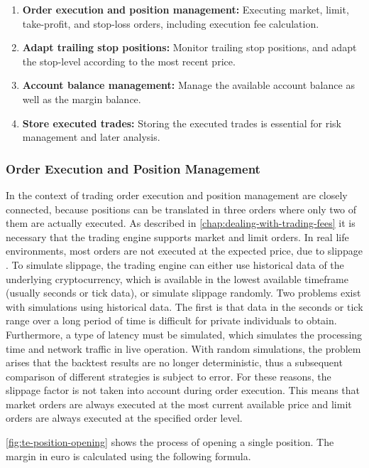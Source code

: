 \begin{enumerate}
    \item \textbf{Order execution and position management:} Executing market, limit, take-profit, and stop-loss orders, including execution fee calculation.
    \item \textbf{Adapt trailing stop positions:} Monitor trailing stop positions, and adapt the stop-level according to the most recent price.
    \item \textbf{Account balance management:} Manage the available account balance as well as the margin balance.
    \item \textbf{Store executed trades:} Storing the executed trades is essential for risk management and later analysis.
\end{enumerate}

\subsubsection{Order Execution and Position Management}

In the context of trading order execution and position management are closely connected, because positions can be translated in three orders where only two of them are actually executed.
As described in \autoref{chap:dealing-with-trading-fees} it is necessary that the trading engine supports market and limit orders.
In real life environments, most orders are not executed at the expected price, due to slippage \cite{ig-slippage}.
To simulate slippage, the trading engine can either use historical data of the underlying cryptocurrency, which is available in the lowest available timeframe (usually seconds or tick data), or simulate slippage randomly.
Two problems exist with simulations using historical data.
The first is that data in the seconds or tick range over a long period of time is difficult for private individuals to obtain.
Furthermore, a type of latency must be simulated, which simulates the processing time and network traffic in live operation.
With random simulations, the problem arises that the backtest results are no longer deterministic, thus a subsequent comparison of different strategies is subject to error.
For these reasons, the slippage factor is not taken into account during order execution.
This means that market orders are always executed at the most current available price and limit orders are always executed at the specified order level.


\autoref{fig:te-position-opening} shows the process of opening a single position.
The margin in euro is calculated using the following formula.


